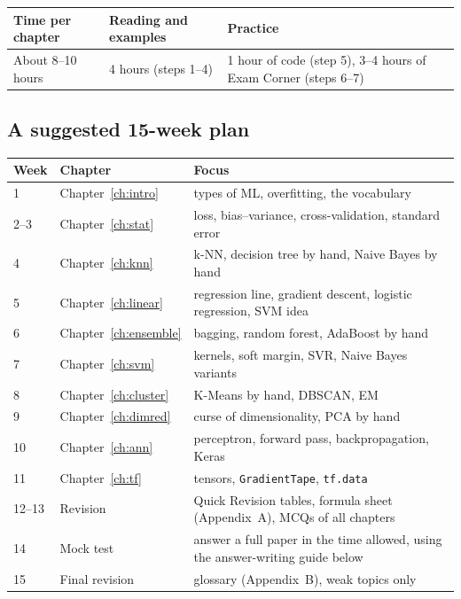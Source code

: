 \begin{center}
\begin{tabular}{@{}p{2.8cm}p{4.2cm}p{6.2cm}@{}}
\toprule
\textbf{Time per chapter} & \textbf{Reading and examples} & \textbf{Practice}\\
\midrule
About 8--10 hours & 4 hours (steps 1--4) & 1 hour of code (step 5), 3--4 hours of Exam Corner (steps 6--7)\\
\bottomrule
\end{tabular}
\end{center}

\subsection*{A suggested 15-week plan}

\begin{center}
\small
\begin{tabular}{@{}p{2.2cm}p{4.3cm}p{7.2cm}@{}}
\toprule
\textbf{Week} & \textbf{Chapter} & \textbf{Focus}\\
\midrule
1 & Chapter~\ref{ch:intro} & types of ML, overfitting, the vocabulary\\
2--3 & Chapter~\ref{ch:stat} & loss, bias--variance, cross-validation, standard error\\
4 & Chapter~\ref{ch:knn} & k-NN, decision tree by hand, Naive Bayes by hand\\
5 & Chapter~\ref{ch:linear} & regression line, gradient descent, logistic regression, SVM idea\\
6 & Chapter~\ref{ch:ensemble} & bagging, random forest, AdaBoost by hand\\
7 & Chapter~\ref{ch:svm} & kernels, soft margin, SVR, Naive Bayes variants\\
8 & Chapter~\ref{ch:cluster} & K-Means by hand, DBSCAN, EM\\
9 & Chapter~\ref{ch:dimred} & curse of dimensionality, PCA by hand\\
10 & Chapter~\ref{ch:ann} & perceptron, forward pass, backpropagation, Keras\\
11 & Chapter~\ref{ch:tf} & tensors, \texttt{GradientTape}, \texttt{tf.data}\\
12--13 & Revision & Quick Revision tables, formula sheet (Appendix~A), MCQs of all chapters\\
14 & Mock test & answer a full paper in the time allowed, using the answer-writing guide below\\
15 & Final revision & glossary (Appendix~B), weak topics only\\
\bottomrule
\end{tabular}
\end{center}

